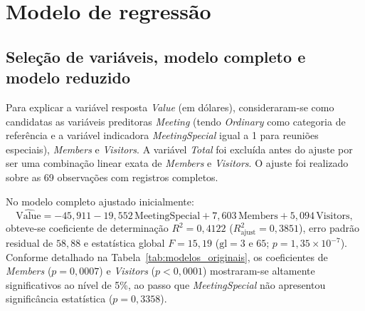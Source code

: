 \documentclass[11pt,a4paper]{article}
\begin{document}
\section{Modelo de regressão}

\subsection{Seleção de variáveis, modelo completo e modelo reduzido}

Para explicar a variável resposta \textit{Value} (em dólares), consideraram-se como candidatas as variáveis preditoras \textit{Meeting} (tendo \textit{Ordinary} como categoria de referência e a variável indicadora \textit{MeetingSpecial} igual a 1 para reuniões especiais), \textit{Members} e \textit{Visitors}. A variável \textit{Total} foi excluída antes do ajuste por ser uma combinação linear exata de \textit{Members} e \textit{Visitors}. O ajuste foi realizado sobre as 69 observações com registros completos.

No modelo completo ajustado inicialmente:
\[
\widehat{\text{Value}} = -45{,}911 - 19{,}552\,\text{MeetingSpecial} + 7{,}603\,\text{Members} + 5{,}094\,\text{Visitors},
\]
obteve-se coeficiente de determinação $R^2 = 0{,}4122$ ($R^2_{\text{ajust}} = 0{,}3851$), erro padrão residual de $58{,}88$ e estatística global $F = 15{,}19$ ($\text{gl} = 3$ e $65$; $p = 1{,}35 \times 10^{-7}$). Conforme detalhado na Tabela~\ref{tab:modelos_originais}, os coeficientes de \textit{Members} ($p = 0{,}0007$) e \textit{Visitors} ($p < 0{,}0001$) mostraram-se altamente significativos ao nível de 5\%, ao passo que \textit{MeetingSpecial} não apresentou significância estatística ($p = 0{,}3358$).
\end{document}
